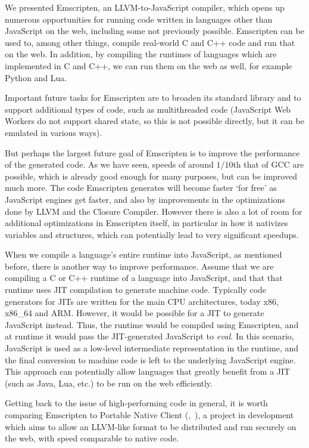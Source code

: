 \documentclass[11pt]{proc}
\begin{document}
We presented Emscripten, an LLVM-to-JavaScript compiler, which opens up
numerous opportunities for running code written in languages other
than JavaScript on the web, including some not previously possible.
Emscripten can be used to, among other
things, compile real-world C and C++ code and run that on the web. In
addition, by compiling the runtimes of languages which are implemented in C and C++,
we can run them on the web as well, for example Python and Lua.

Important future tasks for Emscripten are to broaden its
standard library and to support additional types of code, such as
multithreaded code (JavaScript Web Workers do not support shared state,
so this is not possible directly, but it can be emulated in various ways).

But perhaps the largest future goal of Emscripten is to improve the performance of
the generated code. As we have seen, speeds of around $1/10$th that of
GCC are possible, which is already good enough for many purposes, but
can be improved much more. The code Emscripten generates will become faster
`for free' as JavaScript engines get
faster, and also by improvements in the optimizations done by LLVM and the Closure
Compiler. However there is also a lot of room for additional optimizations in
Emscripten itself, in particular in how it nativizes variables and structures,
which can potentially lead to very significant speedups.

When we compile a language's entire runtime into JavaScript, as mentioned
before, there is another way to improve performance.
Assume that we are compiling a C or C++ runtime of a language
into JavaScript, and that that runtime uses JIT compilation to generate machine code. Typically
code generators for JITs are written for the main CPU architectures, today
x86, x86\_64 and ARM. However, it would be possible for a JIT to
generate JavaScript instead. Thus, the runtime would be compiled using
Emscripten, and at runtime it would pass the JIT-generated JavaScript to
\emph{eval}. In this
scenario, JavaScript is used as a low-level intermediate representation in
the runtime, and the final conversion to machine code is left to the underlying
JavaScript engine. This approach can potentially allow languages that 
greatly benefit from a JIT (such as Java, Lua, etc.) to be run on the web
efficiently.

Getting back to the issue of high-performing code in general, it is worth comparing
Emscripten to Portable Native Client (\cite{pnacl},~\cite{nacl}), a project in development which aims
to allow an LLVM-like format to be distributed and run securely
on the web, with speed comparable to native code.
\end{document}
